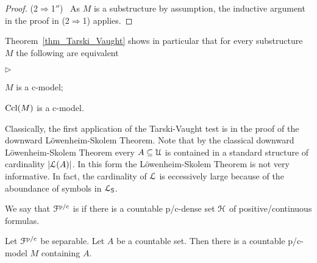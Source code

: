 \documentclass{amsproc}
\newcommand{\mylabel}[1]{{#1}\hfill}
\renewenvironment{itemize}
  {\begin{list}{$\triangleright$}{%
  \setlength{\parskip}{0mm}
  \setlength{\topsep}{.4\baselineskip}
  \setlength{\rightmargin}{0mm}
  \setlength{\listparindent}{0mm}
  \setlength{\itemindent}{0mm}
  \setlength{\labelwidth}{3ex}
  \setlength{\itemsep}{.2\baselineskip}
  \setlength{\parsep}{.2\baselineskip}
  \setlength{\partopsep}{0mm}
  \setlength{\labelsep}{1ex}
  \setlength{\leftmargin}{\labelwidth+\labelsep}
  \let\makelabel\mylabel}}{%
\end{list}}
\renewcommand*{\emph}[1]{%
   \smash{\tikz[baseline]\node[rectangle, fill=teal!25, rounded corners, inner xsep=0.5ex, inner ysep=0.2ex, anchor=base, minimum height = 2.7ex]{\strut #1};}}
\begin{document}
{\begin{proof}
  (2$\Rightarrow$1$''$) \ 
  As $M$ is a substructure by assumption, the inductive argument in the proof in (2$\Rightarrow$1) applies.
\end{proof}


    
   


\begin{remark}\label{rem_Tarski_Vaught}
  Theorem~\ref{thm_Tarski_Vaught} shows in particular that for every substructure $M$ the following are equivalent
  \begin{itemize}
    \item[1.] $M$ is a c-model;
    \item[2.] ${\rm Ccl}(M)$ is a c-model.
  \end{itemize}
\end{remark}

Classically, the first application of the Tarski-Vaught test is in the proof of the downward L\"owen\-heim-Skolem Theorem.
Note that by the classical downward L\"owenheim-Skolem Theorem every $A\subseteq{\EuScript U}$ is contained in a standard structure of cardinality $|{\EuScript L}(A)|$.
In this form the L\"owenheim-Skolem Theorem is not very informative.
In fact, the cardinality of ${\EuScript L}$ is eccessively large because of the aboundance of symbols in ${\EuScript L}_{\sf S}$.

We say that ${\EuScript F}^{\rm p/c}$ is \emph{separable\/} if there is a countable p/c-dense set ${\EuScript H}$ of positive/continuous formulas.

\begin{proposition}
  Let ${\EuScript F}^{\rm p/c}$ be separable.
  Let $A$ be a countable set.
  Then there is a countable p/c-model $M$ containing $A$.
\end{proposition}

}
\end{document}
